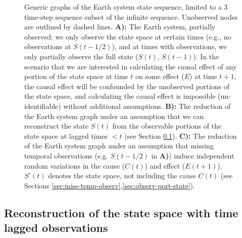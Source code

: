 \documentclass[12pt]{article}
\begin{document}
\begin{figure} 
  \caption{Generic graphs of the Earth system state sequence, limited
    to a 3 time-step sequence subset of the infinite
    sequence. Unobserved nodes are outlined by dashed
    lines. \textbf{A):} The Earth system, partially observed: we only
    observe the state space at certain times (e.g., no observations at
    $S(t-1/2)$), and at times with observations, we only partially
    observe the full state ($S(t)$, $S(t-1)$). In the scenario that we
    are interested in calculating the causal effect of any portion of
    the state space at time $t$ on some effect ($E$) at time $t+1$,
    the causal effect will be confounded by the unobserved portions of
    the state space, and calculating the causal effect is impossible
    (un-identifiable) without additional assumptions. \textbf{B):} The
    reduction of the Earth system graph under an assumption that we
    can reconstruct the state $S(t)$ from the observable portions of
    the state space at lagged times $< t$ (see Section
    \ref{sec:stat-reconstr-state}). \textbf{C):} The reduction of the
    Earth system graph under an assumption that missing temporal
    observations (e.g. $S(t-1/2)$ in \textbf{A)}) induce independent
    random variations in the cause ($C(t)$) and effect
    ($E(t+1)$). $S'(t)$ denotes the state space, not including the
    cause $C(t)$ (see Sections
    \ref{sec:miss-temp-observ},\ref{sec:observ-port-state}).}
  \label{fig:generic}
\end{figure}

\subsection{Reconstruction of the state space with time
  lagged observations}
\label{sec:stat-reconstr-state}

\end{document}
